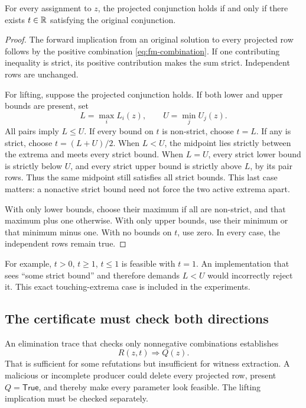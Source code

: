 \begin{theorem}\label{thm:projection}
For every assignment to \(z\), the projected conjunction holds if and only if there exists \(t\in\mathbb{R}\) satisfying the original conjunction.
\end{theorem}
\begin{proof}
The forward implication from an original solution to every projected row follows by the positive combination \eqref{eq:fm-combination}. If one contributing inequality is strict, its positive contribution makes the sum strict. Independent rows are unchanged.

For lifting, suppose the projected conjunction holds. If both lower and upper bounds are present, set
\[
 L=\max_i L_i(z),\qquad U=\min_j U_j(z).
\]
All pairs imply \(L\le U\). If every bound on \(t\) is non-strict, choose \(t=L\). If any is strict, choose \(t=(L+U)/2\). When \(L<U\), the midpoint lies strictly between the extrema and meets every strict bound. When \(L=U\), every strict lower bound is strictly below \(U\), and every strict upper bound is strictly above \(L\), by its pair rows. Thus the same midpoint still satisfies all strict bounds. This last case matters: a nonactive strict bound need not force the two active extrema apart.

With only lower bounds, choose their maximum if all are non-strict, and that maximum plus one otherwise. With only upper bounds, use their minimum or that minimum minus one. With no bounds on \(t\), use zero. In every case, the independent rows remain true.
\end{proof}

For example, \(t>0\), \(t\ge1\), \(t\le1\) is feasible with \(t=1\). An implementation that sees ``some strict bound'' and therefore demands \(L<U\) would incorrectly reject it. This exact touching-extrema case is included in the experiments.

\subsection{The certificate must check both directions}
An elimination trace that checks only nonnegative combinations establishes
\[
 R(z,t)\Longrightarrow Q(z).
\]
That is sufficient for some refutations but insufficient for witness extraction. A malicious or incomplete producer could delete every projected row, present \(Q=\mathsf{True}\), and thereby make every parameter look feasible. The lifting implication must be checked separately.

